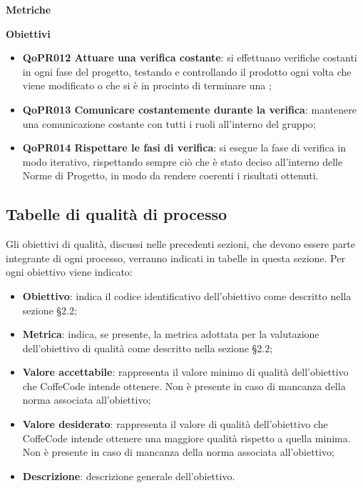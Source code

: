 \documentclass[../paino-di-qualifica.tex]{subfiles}
\begin{document}
\textbf{Metriche}

\textbf{Obiettivi}
\begin{itemize}
    \item \textbf{QoPR012 Attuare una verifica costante}: si effettuano verifiche costanti in ogni fase del progetto, testando e controllando il prodotto ogni volta che viene modificato o che si è in procinto di terminare una ;
    \item \textbf{QoPR013 Comunicare costantemente durante la verifica}: mantenere una comunicazione costante con tutti i ruoli all'interno del gruppo;
    \item \textbf{QoPR014 Rispettare le fasi di verifica}: si esegue la fase di verifica in modo iterativo, rispettando sempre ciò che è stato deciso all'interno delle Norme di Progetto, in modo da rendere coerenti i risultati ottenuti.
\end{itemize}

\subsection{Tabelle di qualità di processo}
\label{sub:tabelle_di_qualita_di_processo}
Gli obiettivi di qualità, discussi nelle precedenti sezioni, che devono essere parte integrante di ogni processo, verranno indicati in tabelle in questa sezione.
Per ogni obiettivo viene indicato:

\begin{itemize}
   \item \textbf{Obiettivo}: indica il codice identificativo dell'obiettivo come descritto nella sezione §2.2;
   \item \textbf{Metrica}: indica, se presente, la metrica adottata per la valutazione dell'obiettivo di qualità come descritto nella sezione §2.2;
   \item \textbf{Valore accettabile}: rappresenta il valore minimo di qualità dell'obiettivo che CoffeCode intende ottenere. Non è presente in caso di mancanza della norma associata all'obiettivo;
   \item \textbf{Valore desiderato}: rappresenta il valore di qualità dell'obiettivo che CoffeCode intende ottenere una maggiore qualità rispetto a quella minima. Non è presente in caso di mancanza della norma associata all'obiettivo;
   \item \textbf{Descrizione}: descrizione generale dell'obiettivo.
\end{itemize}
\end{document}

